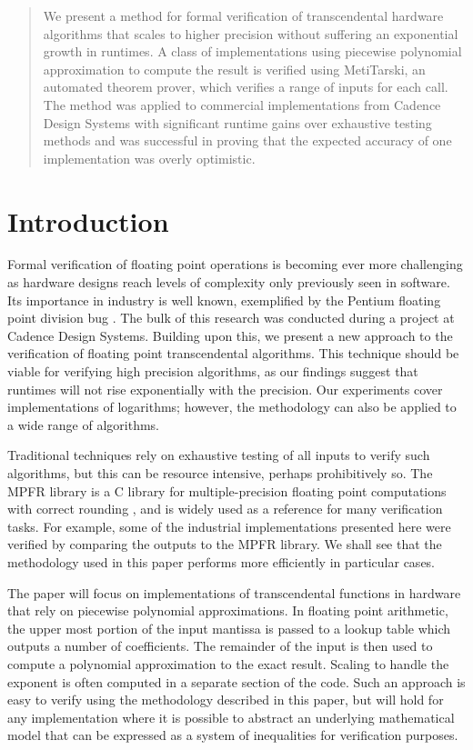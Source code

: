\begin{abstract}
We present a method for formal verification of transcendental hardware algorithms that scales to higher precision without suffering an exponential growth in runtimes. A class of implementations using piecewise polynomial approximation to compute the result is verified using MetiTarski, an automated theorem prover, which verifies a range of inputs for each call. The method was applied to commercial implementations from Cadence Design Systems with significant runtime gains over exhaustive testing methods and was successful in proving that the expected accuracy of one implementation was overly optimistic.
\end{abstract}

\section{Introduction}
\label{intro}
Formal verification of floating point operations is becoming ever more challenging as hardware designs reach levels of complexity only previously seen in software. Its importance in industry is well known, exemplified by the Pentium floating point division bug \cite{pratt1995anatomy}. The bulk of this research was conducted during a project at Cadence Design Systems. Building upon this, we present a new approach to the verification of floating point transcendental algorithms. This technique should be viable for verifying high precision algorithms, as our findings suggest that runtimes will not rise exponentially with the precision.  Our experiments cover implementations of logarithms; however, the methodology can also be applied to a wide range of algorithms. 

Traditional techniques rely on exhaustive testing of all inputs to verify such algorithms, but this can be resource intensive, perhaps prohibitively so. The MPFR library is a C library for multiple-precision floating point computations with correct rounding \cite{fousse2007mpfr}, and is widely used as a reference for many verification tasks. For example, some of the industrial implementations presented here were verified by comparing the outputs to the MPFR library. We shall see that the methodology used in this paper performs more efficiently in particular cases. 


The paper will focus on implementations of transcendental functions in hardware that rely on piecewise polynomial approximations. In floating point arithmetic, the upper most portion of the input mantissa is passed to a lookup table which outputs a number of coefficients. The remainder of the input is then used to compute a polynomial approximation to the exact result. Scaling to handle the exponent is often computed in a separate section of the code. Such an approach is easy to verify using the methodology described in this paper, but will hold for any implementation where it is possible to abstract an underlying mathematical model that can be expressed as a system of inequalities for verification purposes.

